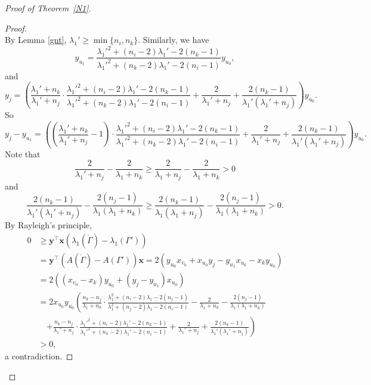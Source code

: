 \documentclass[12pt]{article}
\numberwithin{equation}{section}
\begin{document}
\begin{proof}[Proof of Theorem~\ref{N1}]
\begin{proof}
\[\]
By Lemma \ref{gnt}, $\lambda_1'\ge \min\{n_i, n_k\}$. 
Similarly, we have 
\[
y_{u_1}=\frac{\lambda_1'^2+(n_i-2)\lambda_1'-2(n_k-1)}{\lambda_1'^2+(n_k-2)\lambda_1'-2(n_i-1)}y_{u_0},  
\]
and 
\[
y_j=\left(\frac{\lambda_1'+n_k}{\lambda_1'+n_j}\cdot\frac{\lambda_1'^2+(n_i-2)\lambda_1'-2(n_k-1)}{\lambda_1'^2+(n_k-2)\lambda_1'-2(n_i-1)}+\frac{2}{\lambda_1'+n_j}+\frac{2(n_k-1)}{\lambda_1'(\lambda_1'+n_j)}\right)y_{u_0}. 
\]
So
\[
y_j-y_{u_1}=\left(\left(\frac{\lambda_1'+n_k}{\lambda_1'+n_j}-1\right)\cdot\frac{\lambda_1'^2+(n_i-2)\lambda_1'-2(n_k-1)}{\lambda_1'^2+(n_k-2)\lambda_1'-2(n_i-1)}+\frac{2}{\lambda_1'+n_j}+\frac{2(n_k-1)}{\lambda_1'(\lambda_1'+n_j)}\right)y_{u_0}.
\]
Note that
\[
\frac{2}{\lambda_1'+n_j}-\frac{2}{\lambda_1+n_k}\ge \frac{2}{\lambda_1+n_j}-\frac{2}{\lambda_1+n_k}>0
\]
and 
\[
\frac{2(n_k-1)}{\lambda_1'(\lambda_1'+n_j)}-\frac{2(n_j-1)}{\lambda_1(\lambda_1+n_k)}\ge \frac{2(n_k-1)}{\lambda_1(\lambda_1+n_j)}-\frac{2(n_j-1)}{\lambda_1(\lambda_1+n_k)}>0.
\]
By Rayleigh's principle, 
\begin{align*}
0& \ge \mathbf{y}^\top\mathbf{x}(\lambda_1(\dot{\Gamma})-\lambda_1(\Gamma'))\\
& = \mathbf{y}^\top\left(A(\dot{\Gamma})-A(\Gamma')\right)\mathbf{x}=2\left(y_{u_0}x_{v_0}+x_{u_0}y_j-y_{u_1}x_{u_0}-x_ky_{u_0}\right)\\ 
& =2\left((x_{v_0}-x_k)y_{u_0}+(y_j-y_{u_1})x_{u_0}\right)\\
& =2x_{u_0}y_{u_0}\left(\frac{n_k-n_j}{\lambda_1+n_k}\cdot\frac{\lambda_1^2+(n_i-2)\lambda_1-2(n_j-1)}{\lambda_1^2+(n_j-2)\lambda_1-2(n_i-1)}-\frac{2}{\lambda_1+n_k}-\frac{2(n_j-1)}{\lambda_1(\lambda_1+n_k)}\right.\\
& \quad\left.+\frac{n_k-n_j}{\lambda_1'+n_j}\cdot\frac{\lambda_1'^2+(n_i-2)\lambda_1'-2(n_k-1)}{\lambda_1'^2+(n_k-2)\lambda_1'-2(n_i-1)}+\frac{2}{\lambda_1'+n_j}+\frac{2(n_k-1)}{\lambda_1'(\lambda_1'+n_j)}\right)\\
& >0, 
\end{align*}
a contradiction. 
\end{proof}


\end{proof}
\end{document}
